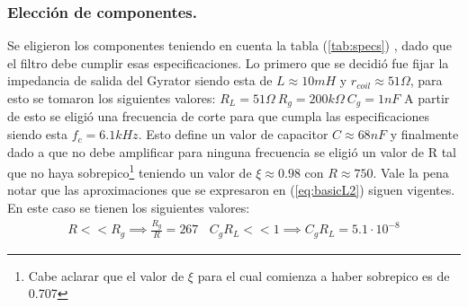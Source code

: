 \documentclass[a4paper]{article}
\begin{document}
\subsubsection{Elección de componentes.}
Se eligieron los componentes teniendo en cuenta la tabla (\ref{tab:specs}) , dado que el filtro debe cumplir esas especificaciones.
Lo primero que se decidió fue fijar la impedancia de salida del Gyrator siendo esta de $L \approx 10mH $ y $r_{coil} \approx 51\Omega $, para esto se tomaron los siguientes valores: $R_L = 51\Omega \ R_g = 200k\Omega \ C_g = 1nF$
A partir de esto se eligió una frecuencia de corte para que cumpla las especificaciones siendo esta $f_c =6.1kHz $. Esto define un valor de capacitor $C \approx 68nF$ y finalmente dado a que no debe amplificar para ninguna frecuencia se eligió un valor de R tal que no haya sobrepico\footnote{Cabe aclarar que el valor de $\xi$ para el cual comienza a haber sobrepico es de 0.707} teniendo un valor de $\xi \approx 0.98 $ con $R \approx 750 $.
	Vale la pena notar que las aproximaciones que se expresaron en (\ref{eq:basicL2}) siguen vigentes. En este caso se tienen los siguientes valores:
\begin{align}  R<<R_g \implies  \frac{R_g}{R}=  267 \ \ \ \ C_gR_L << 1 \implies C_gR_L=5.1 \cdot 10^{-8} \end{align}

\end{document}
